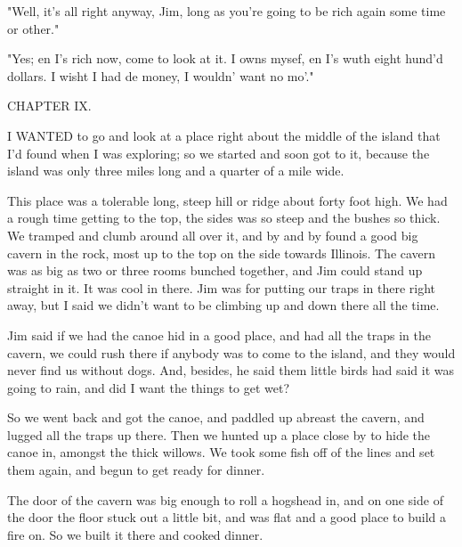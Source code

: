 "Well, it's all right anyway, Jim, long as you're going to be rich again
some time or other."

"Yes; en I's rich now, come to look at it.  I owns mysef, en I's wuth
eight hund'd dollars.  I wisht I had de money, I wouldn' want no mo'."




CHAPTER IX.

I WANTED to go and look at a place right about the middle of the island
that I'd found when I was exploring; so we started and soon got to it,
because the island was only three miles long and a quarter of a mile
wide.

This place was a tolerable long, steep hill or ridge about forty foot
high. We had a rough time getting to the top, the sides was so steep and
the bushes so thick.  We tramped and clumb around all over it, and by and
by found a good big cavern in the rock, most up to the top on the side
towards Illinois.  The cavern was as big as two or three rooms bunched
together, and Jim could stand up straight in it.  It was cool in there.
Jim was for putting our traps in there right away, but I said we didn't
want to be climbing up and down there all the time.

Jim said if we had the canoe hid in a good place, and had all the traps
in the cavern, we could rush there if anybody was to come to the island,
and they would never find us without dogs.  And, besides, he said them
little birds had said it was going to rain, and did I want the things to
get wet?

So we went back and got the canoe, and paddled up abreast the cavern, and
lugged all the traps up there.  Then we hunted up a place close by to
hide the canoe in, amongst the thick willows.  We took some fish off of
the lines and set them again, and begun to get ready for dinner.

The door of the cavern was big enough to roll a hogshead in, and on one
side of the door the floor stuck out a little bit, and was flat and a
good place to build a fire on.  So we built it there and cooked dinner.


